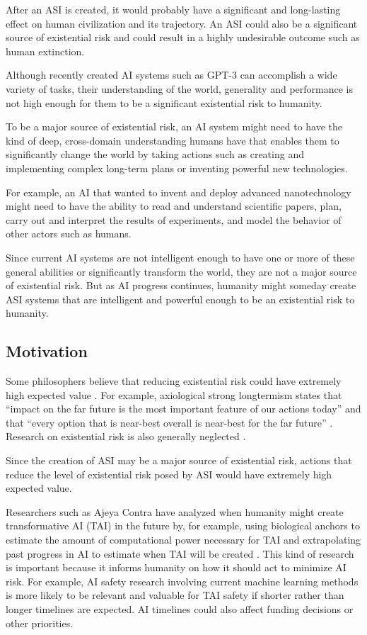 \documentclass{article}
\begin{document}
After an ASI is created, it would probably have a significant and long-lasting effect on human civilization and its trajectory. An ASI could also be a significant source of existential risk and could result in a highly undesirable outcome such as human extinction.

Although recently created AI systems such as GPT-3 can accomplish a wide variety of tasks, their understanding of the world, generality and performance is not high enough for them to be a significant existential risk to humanity.

To be a major source of existential risk, an AI system might need to have the kind of deep, cross-domain understanding humans have that enables them to significantly change the world by taking actions such as creating and implementing complex long-term plans or inventing powerful new technologies.

For example, an AI that wanted to invent and deploy advanced nanotechnology might need to have the ability to read and understand scientific papers, plan, carry out and interpret the results of experiments, and model the behavior of other actors such as humans.

Since current AI systems are not intelligent enough to have one or more of these general abilities or significantly transform the world, they are not a major source of existential risk. But as AI progress continues, humanity might someday create ASI systems that are intelligent and powerful enough to be an existential risk to humanity.

\subsection{Motivation}

Some philosophers believe that reducing existential risk could have extremely high expected value \cite{bostrom2013existential, stronglongtermism}. For example, axiological strong longtermism states that “impact on the far future is the most important feature of our actions today” and that “every option that is near-best overall is near-best for the far future” \cite{stronglongtermism}. Research on existential risk is also generally neglected \cite{bostrom2013existential}.

Since the creation of ASI may be a major source of existential risk, actions that reduce the level of existential risk posed by ASI would have extremely high expected value.

Researchers such as Ajeya Contra have analyzed when humanity might create transformative AI (TAI) in the future by, for example, using biological anchors to estimate the amount of computational power necessary for TAI and extrapolating past progress in AI to estimate when TAI will be created \cite{forecastingtai}. This kind of research is important because it informs humanity on how it should act to minimize AI risk. For example, AI safety research involving current machine learning methods is more likely to be relevant and valuable for TAI safety if shorter rather than longer timelines are expected. AI timelines could also affect funding decisions or other priorities.
\end{document}
